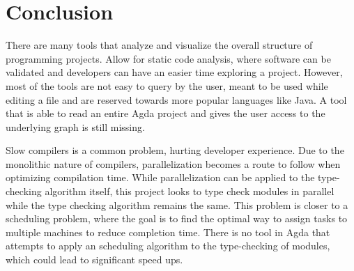 \section{Conclusion}

There are many tools that analyze and visualize the overall structure of
programming projects. Allow for static code analysis, where software can be
validated and developers can have an easier time exploring a project. However,
most of the tools are not easy to query by the user, meant to be used while
editing a file and are reserved towards more popular languages like Java. A
tool that is able to read an entire Agda project and gives the user access to
the underlying graph is still missing.

Slow compilers is a common problem, hurting developer experience. Due to the
monolithic nature of compilers, parallelization becomes a route to follow when
optimizing compilation time. While parallelization can be applied to the
type-checking algorithm itself, this project looks to type check modules in
parallel while the type checking algorithm remains the same. This problem is
closer to a scheduling problem, where the goal is to find the optimal way to
assign tasks to multiple machines to reduce completion time. There is no tool
in Agda that attempts to apply an scheduling algorithm to the type-checking of
modules, which could lead to significant speed ups.  




